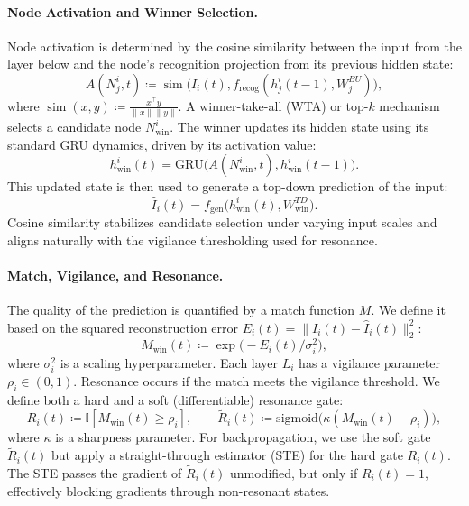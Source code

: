 \documentclass{article}
\DeclareMathOperator{\simop}{sim}
\numberwithin{figure}{section}
\numberwithin{table}{section}
\numberwithin{algorithm}{section}
\begin{document}
\paragraph{Node Activation and Winner Selection.} Node activation is determined by the cosine similarity between the input from the layer below and the node's recognition projection from its previous hidden state:
\begin{equation}
    A(N_j^i, t) \coloneqq \simop\big(I_i(t), f_{\text{recog}}(h_j^i(t-1), W_j^{BU})\big),
\end{equation}
where $\simop(x,y) \coloneqq \frac{x^\top y}{\|x\|\|y\|}$. A winner-take-all (WTA) or top-$k$ mechanism selects a candidate node $N_{\text{win}}^i$. The winner updates its hidden state using its standard GRU dynamics, driven by its activation value:
\begin{equation}
    h_{\text{win}}^i(t) = \text{GRU}\big(A(N_{\text{win}}^i, t), h_{\text{win}}^i(t-1)\big).
\end{equation}
This updated state is then used to generate a top-down prediction of the input:
\begin{equation}
    \hat{I}_i(t) = f_{\text{gen}}\big(h_{\text{win}}^i(t), W_{\text{win}}^{TD}\big).
\end{equation}
Cosine similarity stabilizes candidate selection under varying input scales and aligns naturally with the vigilance thresholding used for resonance.

\paragraph{Match, Vigilance, and Resonance.} The quality of the prediction is quantified by a match function $M$. We define it based on the squared reconstruction error $E_i(t) = \|I_i(t) - \hat{I}_i(t)\|_2^2$:
\begin{equation}
    M_{\text{win}}(t) \coloneqq \exp\big(-E_i(t) / \sigma_i^2\big),
\end{equation}
where $\sigma_i^2$ is a scaling hyperparameter. Each layer $L_i$ has a vigilance parameter $\rho_i \in (0, 1)$. Resonance occurs if the match meets the vigilance threshold. We define both a hard and a soft (differentiable) resonance gate:
\begin{equation}
    R_i(t) \coloneqq \mathbb{I}[M_{\text{win}}(t) \ge \rho_i], \qquad
    \tilde{R}_i(t) \coloneqq \text{sigmoid}\big(\kappa(M_{\text{win}}(t) - \rho_i)\big),
\end{equation}
where $\kappa$ is a sharpness parameter. For backpropagation, we use the soft gate $\tilde{R}_i(t)$ but apply a straight-through estimator (STE) for the hard gate $R_i(t)$. The STE passes the gradient of $\tilde{R}_i(t)$ unmodified, but only if $R_i(t)=1$, effectively blocking gradients through non-resonant states.
\end{document}
